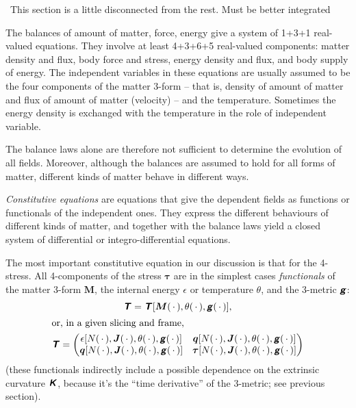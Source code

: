 \documentclass[\ifafour a4paper,12pt,\else a5paper,10pt,\fi%
onecolumn,oneside,article,%
british%
]{memoir}
\theoremstyle{remark}
\theoremstyle{innote}
\newcommand*{\mathte}[1]{\textbf{\textit{\textsf{#1}}}}
\newcommand*{\dotv}{\mathord{\,\cdot\,}}%
\renewcommand*{\|}[1][]{\nonscript\,#1\vert\nonscript\;\mathopen{}}
\newcommand*{\puzzle}{{\fontencoding{U}\fontfamily{fontawesometwo}\selectfont\symbol{225}}}
\newcommand{\mynote}[1]{ {\color{notecolour}\puzzle\ #1}}
\newcommand*{\yd}{N}
\newcommand*{\yrr}{M}
\newcommand*{\yr}{\bm{\yrr}}
\newcommand*{\yjj}{J}
\newcommand*{\yj}{\bm{\yjj}}
\newcommand*{\yqq}{q}
\newcommand*{\yq}{\bm{\yqq}}
\newcommand*{\yTT}{\tau}
\newcommand*{\yT}{\bm{\yTT}}
\newcommand*{\yTTf}{T}
\newcommand*{\yTf}{\mathte{\yTTf}}
\newcommand*{\ygg}{g}
\newcommand*{\yg}{\mathte{\ygg}}
\newcommand*{\yKK}{K}
\newcommand*{\yK}{\mathte{\yKK}}
\newcommand*{\ypp}{q}
\newcommand*{\yp}{\bm{\ypp}}
\newcommand*{\ye}{\epsilon}
\newcommand*{\yte}{\theta}
\begin{document}
\mynote{This section is a little disconnected from the rest. Must be better
integrated}

The balances of amount of matter, force, energy give a system of 1+3+1
real-valued equations. They involve at least 4+3+6+5 real-valued
components: matter density and flux, body force and stress, energy density
and flux, and body supply of energy. The independent variables in these
equations are usually assumed to be the four components of the matter
3-form -- that is, density of amount of matter and flux of amount of matter
(velocity) -- and the temperature. Sometimes the energy density is
exchanged with the temperature in the role of independent variable.

The balance laws alone are therefore not sufficient to determine the
evolution of all fields. Moreover, although the balances are assumed to
hold for all forms of matter, different kinds of matter behave in different
ways.

\emph{Constitutive equations} are equations that give the dependent fields
as functions or functionals of the independent ones. They express the
different behaviours of different kinds of matter, and together with the
balance laws yield a closed system of differential or integro-differential
equations.

The most important constitutive equation in our discussion is that for the
4-stress. All 4-components of the stress $\yT$ are in the simplest cases
\emph{functionals} of the matter 3-form $\yr$, the internal energy $\ye$ or
temperature $\yte$, and the 3-metric $\yg$:
\begin{subequations}\label{eq:constitutive_4stress}
  \begin{gather}
    \label{eq:constit_T_with_mass_geometry}
    \yTf=\yTf[\yr(\dotv),\yte(\dotv),\yg(\dotv)],
    \\
    \shortintertext{or, in a given slicing and frame,}
    \label{eq:4stress_components}
    \yTf =
    \begin{pmatrix}
      \ye[\yd(\dotv),\yj(\dotv),\yte(\dotv),\yg(\dotv)] & \yq[\yd(\dotv),\yj(\dotv),\yte(\dotv),\yg(\dotv)] \\
      \yp[\yd(\dotv),\yj(\dotv),\yte(\dotv),\yg(\dotv)] & \yT[\yd(\dotv),\yj(\dotv),\yte(\dotv),\yg(\dotv)]
    \end{pmatrix}
  \end{gather}
\end{subequations}
(these functionals indirectly include a possible dependence on the
extrinsic curvature $\yK$, because it's the \enquote{time derivative} of
the 3-metric; see previous section).
\end{document}
